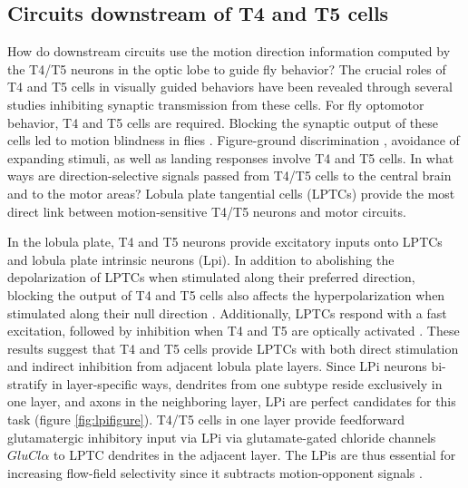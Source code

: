 \subsection{Circuits downstream of T4 and T5 cells}
How do downstream circuits use the motion direction information computed by the T4/T5 neurons in the optic lobe to guide fly behavior? The crucial roles of T4 and T5 cells in visually guided behaviors have been revealed through several studies inhibiting synaptic transmission from these cells. For fly optomotor behavior, T4 and T5 cells are required. Blocking the synaptic output of these cells led to motion blindness in flies \parencite{Bahl2013}. Figure-ground discrimination \parencite{Fenk2014}, avoidance of expanding stimuli, as well as landing responses \parencite{Schilling2015} involve T4 and T5 cells. In what ways are direction-selective signals passed from T4/T5 cells to the central brain and to the motor areas? Lobula plate tangential cells (LPTCs) provide the most direct link between motion-sensitive T4/T5 neurons and motor circuits. 

In the lobula plate, T4 and T5 neurons provide excitatory inputs onto LPTCs and lobula plate intrinsic neurons (Lpi). In addition to abolishing the depolarization of LPTCs when stimulated along their preferred direction, blocking the output of T4 and T5 cells also affects the hyperpolarization when stimulated along their null direction \parencite{Schnell2012}. Additionally, LPTCs respond with a fast excitation, followed by inhibition when T4 and T5 are optically activated \parencite{Mauss2015}. These results suggest that T4 and T5 cells provide LPTCs with both direct stimulation and indirect inhibition from adjacent lobula plate layers. Since LPi neurons bi-stratify in layer-specific ways, dendrites from one subtype reside exclusively in one layer, and axons in the neighboring layer, LPi are perfect candidates for this task (figure \ref{fig:lpifigure}). T4/T5 cells in one layer provide feedforward glutamatergic inhibitory input via LPi via glutamate-gated chloride channels \textit{$GluCl\alpha$} to LPTC dendrites in the adjacent layer. The LPis are thus essential for increasing flow-field selectivity since it subtracts motion-opponent signals \parencite{Mauss2015}.

